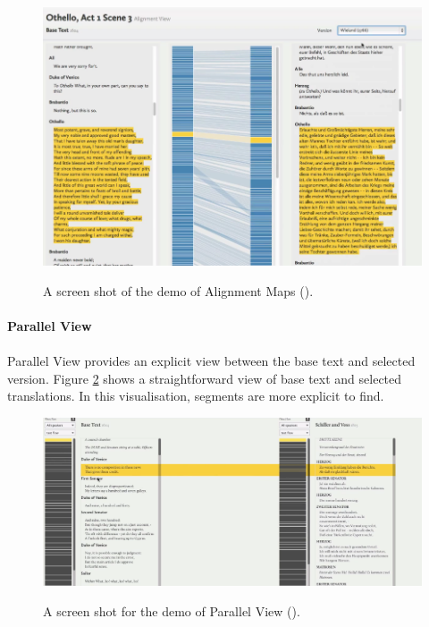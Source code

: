 \begin{figure}[H] 
	\centering    
	\includegraphics[scale=0.7]{Figs/Alignment-Map}\\[1ex]
	\caption{A screen shot of the demo of Alignment Maps (\cite{Cheesman2012}).}
	\label{fig:alignmentMap}
\end{figure} 

\paragraph{Parallel View}
\paragraph[]{}

Parallel View provides an explicit view between the base text and selected version. Figure \ref{fig:parallelView} shows a straightforward view of base text and selected translations.  In this visualisation, segments are more explicit to find.

\begin{figure}[H] 
	\centering    
	\includegraphics[scale=0.6]{Figs/Parallel-View}\\[1ex]
	\caption{A screen shot for the demo of Parallel View (\cite{Cheesman2012}).}
	\label{fig:parallelView}
\end{figure} 

